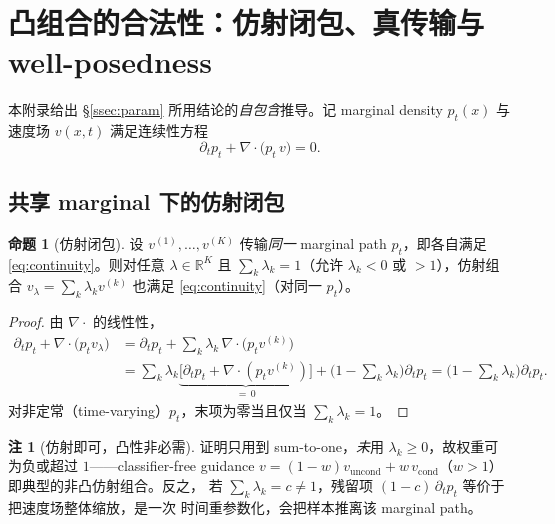 \documentclass[11pt,a4paper]{article}
\newcommand{\R}{\mathbb{R}}
\theoremstyle{definition}
\newtheorem{remark}{注}
\newtheorem{proposition}{命题}
\begin{document}
\appendix
\section{凸组合的合法性：仿射闭包、真传输与 well-posedness}
\label{app:validity}

本附录给出 \S\ref{ssec:param} 所用结论的\emph{自包含}推导。记 marginal density $p_t(x)$
与速度场 $v(x,t)$ 满足连续性方程
\begin{equation}
\partial_t p_t + \nabla\!\cdot\!\big(p_t\,v\big)=0 .
\label{eq:continuity}
\end{equation}

\subsection{共享 marginal 下的仿射闭包}
\label{ssec:app_closure}

\begin{proposition}[仿射闭包]
\label{prop:app_closure}
设 $v^{(1)},\dots,v^{(K)}$ 传输\emph{同一} marginal path $p_t$，即各自满足
\eqref{eq:continuity}。则对任意 $\lambda\in\R^K$ 且 $\sum_k\lambda_k=1$（允许 $\lambda_k<0$
或 $>1$），仿射组合 $v_\lambda=\sum_k\lambda_k v^{(k)}$ 也满足 \eqref{eq:continuity}（对同一
$p_t$）。
\end{proposition}

\begin{proof}
由 $\nabla\!\cdot$ 的线性性，
\begin{align*}
\partial_t p_t+\nabla\!\cdot\!\big(p_t v_\lambda\big)
&=\partial_t p_t+\sum_k\lambda_k\,\nabla\!\cdot\!\big(p_t v^{(k)}\big)\\
&=\sum_k\lambda_k\underbrace{\big[\partial_t p_t+\nabla\!\cdot\!(p_t v^{(k)})\big]}_{=\,0}
+\Big(1-\textstyle\sum_k\lambda_k\Big)\partial_t p_t
=\Big(1-\textstyle\sum_k\lambda_k\Big)\partial_t p_t .
\end{align*}
对非定常（time-varying）$p_t$，末项为零当且仅当 $\sum_k\lambda_k=1$。
\end{proof}

\begin{remark}[仿射即可，凸性非必需]
\label{rem:app_affine}
证明只用到 sum-to-one，\emph{未}用 $\lambda_k\ge0$，故权重可为负或超过 $1$——classifier-free
guidance $v=(1-w)v_{\text{uncond}}+w\,v_{\text{cond}}$（$w>1$）即典型的非凸仿射组合。反之，
若 $\sum_k\lambda_k=c\neq1$，残留项 $(1-c)\,\partial_t p_t$ 等价于把速度场整体缩放，是一次
时间重参数化，会把样本推离该 marginal path。
\end{remark}
\end{document}
